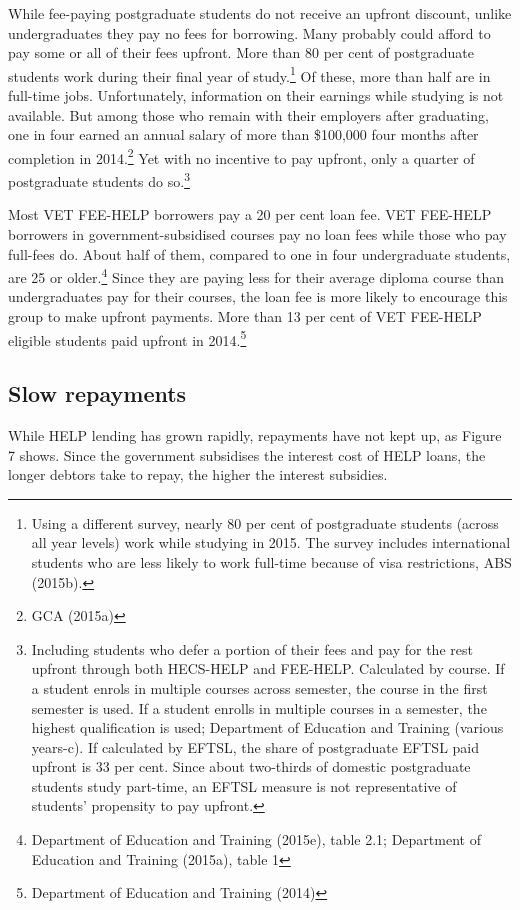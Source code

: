\documentclass[embargoed]{grattan}
\begin{document}
While fee-paying postgraduate students do not receive an upfront discount, unlike undergraduates they pay no fees for borrowing. Many probably could afford to pay some or all of their fees upfront. More than 80 per cent of postgraduate students work during their final year of study.\footnote{Using a different survey, nearly 80 per cent of postgraduate students (across all year levels) work while studying in 2015. The survey includes international students who are less likely to work full-time because of visa restrictions, ABS (2015b).} Of these, more than half are in full-time jobs. Unfortunately, information on their earnings while studying is not available. But among those who remain with their employers after graduating, one in four earned an annual salary of more than \$100,000 four months after completion in 2014.\footnote{GCA (2015a)} Yet with no incentive to pay upfront, only a quarter of postgraduate students do so.\footnote{Including students who defer a portion of their fees and pay for the rest upfront through both HECS-HELP and FEE-HELP. Calculated by course. If a student enrols in multiple courses across semester, the course in the first semester is used. If a student enrolls in multiple courses in a semester, the highest qualification is used; Department of Education and Training (various years-c). If calculated by EFTSL, the share of postgraduate EFTSL paid upfront is 33 per cent. Since about two-thirds of domestic postgraduate students study part-time, an EFTSL measure is not representative of students' propensity to pay upfront.}

Most VET FEE-HELP borrowers pay a 20 per cent loan fee. VET FEE-HELP borrowers in government-subsidised courses pay no loan fees while those who pay full-fees do. About half of them, compared to one in four undergraduate students, are 25 or older.\footnote{Department of Education and Training (2015e), table 2.1; Department of Education and Training (2015a), table 1} Since they are paying less for their average diploma course than undergraduates pay for their courses, the loan fee is more likely to encourage this group to make upfront payments. More than 13 per cent of VET FEE-HELP eligible students paid upfront in 2014.\footnote{Department of Education and Training (2014)}

\subsection{Slow repayments }\label{slow-repayments}

While HELP lending has grown rapidly, repayments have not kept up, as Figure 7 shows. Since the government subsidises the interest cost of HELP loans, the longer debtors take to repay, the higher the interest subsidies.
\end{document}
